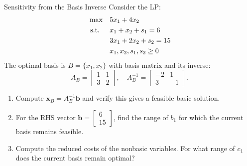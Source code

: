 \begin{ex}{Sensitivity from the Basis Inverse}{}
\label{ex:sensitivity-basis-inverse}
 Consider the LP:
\[
\begin{aligned}
\max \quad & 5x_1 + 4x_2 \\
\mbox{ s.t. } \quad
& x_1 + x_2 + s_1 = 6 \\
& 3x_1 + 2x_2 + s_2 = 15 \\
& x_1, x_2, s_1, s_2 \geq 0
\end{aligned}
\]
The optimal basis is $B = \{x_1, x_2\}$ with basis matrix and its inverse:
\[
A_B = \begin{bmatrix} 1 & 1 \\ 3 & 2 \end{bmatrix}, \quad
A_B^{-1} = \begin{bmatrix} -2 & 1 \\ 3 & -1 \end{bmatrix}.
\]
\begin{enumerate}
\item Compute $\mathbf{x}_B = A_B^{-1}\mathbf{b}$ and verify this gives a feasible basic solution.
\item For the RHS vector $\mathbf{b} = \begin{bmatrix} 6 \\ 15 \end{bmatrix}$, find the range of $b_1$ for which the current basis remains feasible.
\item Compute the reduced costs of the nonbasic variables. For what range of $c_1$ does the current basis remain optimal?
\end{enumerate}
\exrefs{\S\ref{sec:sensitivity-matrix}}
\end{ex}

